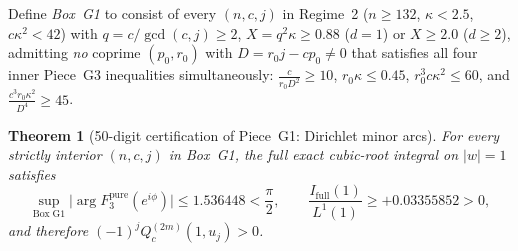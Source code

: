 \documentclass[10pt]{article}
\numberwithin{equation}{section}
\theoremstyle{plain}
\newtheorem{theorem}{Theorem}[section]
\theoremstyle{definition}
\newcommand{\1}{\mathbf{1}}
\begin{document}
Define \emph{Box~G1} to consist of every $(n, c, j)$ in Regime~2 ($n \ge 132$, $\kappa < 2.5$, $c\kappa^2 < 42$) with $q = c/\gcd(c, j) \ge 2$, $X = q^2\kappa \ge 0.88$ ($d = 1$) or $X \ge 2.0$ ($d \ge 2$), admitting \emph{no} coprime $(p_0, r_0)$ with $D = r_0 j - c p_0 \ne 0$ that satisfies all four inner Piece~G3 inequalities simultaneously: $\frac{c}{r_0 D^2} \ge 10$, $r_0\kappa \le 0.45$, $r_0^3 c\kappa^2 \le 60$, and $\frac{c^3 r_0 \kappa^2}{D^4} \ge 45$.

\begin{theorem}[50-digit certification of Piece~G1: Dirichlet minor arcs]\label{thm:G1}
For every strictly interior $(n, c, j)$ in Box~G1, the full exact cubic-root integral on $|w| = 1$ satisfies
\[
\sup_{\mathrm{Box\; G1}} \bigl|\arg F_3^{\mathrm{pure}}(e^{i\phi})\bigr| \le 1.536448 < \frac{\pi}{2},
\qquad
\frac{I_{\mathrm{full}}(1)}{L^1(1)} \ge +0.03355852 > 0,
\]
and therefore $(-1)^j Q_c^{(2m)}(1, u_j) > 0$.
\end{theorem}
\end{document}
